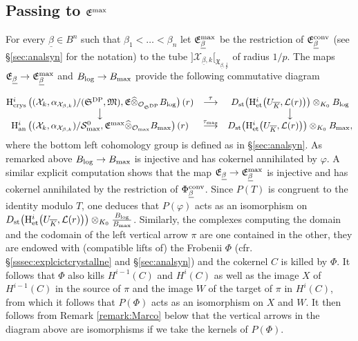 \documentclass[asterisque,english]{smfart}
\begin{document}
\subsection{Passing to $\mathfrak{E}^{\rm max}$}
For every $\underline{\beta}\in B^n$ such that $\beta_1<\ldots < \beta_n$ let $\mathfrak{E}_{\underline{\beta}}^{\rm max}$ be the restriction of $\mathfrak{E}_{\underline{\beta}}^{\rm conv}$ (see \S\ref{sec:analsyn} for the notation) to the tube  $]\mathcal{X}_{\underline{\beta},k}[_{\mathfrak{X}_{\underline{\beta},\frac{1}{p}}}$ of radius $1/p$. 
The maps $\mathfrak{E}_{\underline{\beta}}\to\mathfrak{E}_{\underline{\beta}}^{\rm max}$  and $B_{\rm log}\to B_{\rm max}$ provide the following commutative diagram

$$\begin{matrix}
\mathrm{H}^i_{\mathrm{crys}}\left((\mathcal{X}_k,\alpha_{\mathcal{X}_{\beta,k}})/(\mathfrak{S}^{\rm DP},\mathfrak{M}),\mathfrak{E} \widehat{\otimes}_{\mathcal{O}_{\mathfrak{S}^{\rm DP}}} B_{\rm log}\right)(r) & \stackrel{\tau}{\longrightarrow} & D_{\rm st}\bigl(\mathrm{H}^i_{\mathrm{et}}\bigl(U_{\overline{K}}, \mathcal{L}(r)\bigr) \bigr) \otimes_{K_0} B_{\rm log} \cr \big\downarrow & & \big\downarrow \cr \mathrm{H}^i_{\mathrm{an}}\left((\mathcal{X}_k,\alpha_{\mathcal{X}_{\beta,k}})/\mathcal{S}_{\rm max}^0,\mathfrak{E}^{\rm max} \widehat{\otimes}_{\mathcal{O}_{\rm max}} B_{\rm max}\right)(r)
& \stackrel{\tau_{\rm max}}{\longrightarrow} &  D_{\rm st}\bigl(\mathrm{H}^i_{\mathrm{et}}\bigl(U_{\overline{K}}, \mathcal{L}(r)\bigr) \bigr) \otimes_{K_0} B_{\rm max} ,\cr
\end{matrix}$$where the bottom left cohomology group is defined as in \S \ref{sec:analsyn}. As remarked above $B_{\rm log}\to B_{\rm max}$ is injective and has cokernel annihilated by $\varphi$. A similar explicit computation shows that the map $\mathfrak{E}_{\underline{\beta}}\to\mathfrak{E}_{\underline{\beta}}^{\rm max}$ is injective and has cokernel annihilated by  the restriction of  $\Phi_{\underline{\beta}}^{\rm conv}$. Since $P(T)$ is congruent to the identity modulo $T$, one deduces that $P(\varphi)$ acts as an isomorphism on $D_{\rm st}\bigl(\mathrm{H}^i_{\mathrm{et}}\bigl(U_{\overline{K}}, \mathcal{L}(r)\bigr) \bigr) \otimes_{K_0} \frac{B_{\rm log}}{B_{\rm max}}$. Similarly, the complexes computing the domain and the codomain of the left vertical arrow $\pi$ are one contained in the other, they are endowed with (compatible lifts of) the Frobenii $\Phi$ (cfr. \S \ref{sssec:explcictcrystallne} and \S \ref{sec:analsyn}) and the cokernel $C$ is killed by $\Phi$. It follows that $\Phi$ also kills $H^{i-1}(C)$ and $H^{i}(C)$ as well as the image $X$ of $H^{i-1}(C)$ in the source of $\pi$ and the image $W$ of the target of $\pi$ in $H^{i}(C)$, from which it follows that $P(\Phi)$ acts as an isomorphism on $X$ and $W$. It then follows from Remark \ref{remark:Marco} below that the vertical arrows in the diagram above are isomorphisms if we take the kernels of $P(\Phi)$.  
\end{document}
